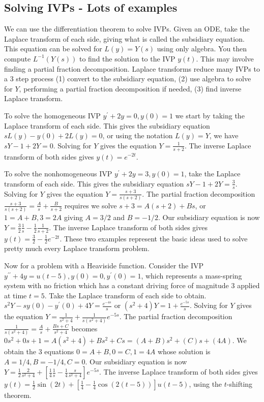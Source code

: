 \subsection{Solving IVPs - Lots of examples}
We can use the differentiation theorem to solve IVPs. Given an ODE, take the Laplace transform of each side, giving what is called the subsidiary equation.  This equation can be solved for $L(y)=Y(s)$ using only algebra.  You then compute $L^{-1}(Y(s))$ to find the solution to the IVP $y(t)$.  This may involve finding a partial fraction decomposition. Laplace transforms reduce many IVPs to a 3 step process (1) convert to the subsidiary equation, (2) use algebra to solve for $Y$, performing a partial fraction decomposition if needed, (3) find inverse Laplace transform.

To solve the homogeneous IVP $y^\prime +2y =0, y(0)=1$ we start by taking the Laplace transform of each side. This gives the subsidiary equation $sL(y)-y(0)+2L(y) = 0$, or using the notation $L(y)=Y$, we have $sY-1+2Y=0$.  Solving for $Y$ gives the equation $Y=\frac{1}{s+2}$. The inverse Laplace transform of both sides gives $y(t) = e^{-2t}$.  

To solve the nonhomogeneous IVP $y^\prime +2y =3, y(0)=1$, take the Laplace transform of each side. This gives the subsidiary equation $sY-1+2Y=\frac{3}{s}$.  Solving for $Y$ gives the equation $Y=\frac{s+3}{s(s+2)}$. The partial fraction decomposition $\frac{s+3}{s(s+2)}=\frac{A}{s}+\frac{B}{s+2}$ requires we solve $s+3 = A(s+2)+Bs$, or $1=A+B, 3=2A$ giving  $A=3/2$ and $B=-1/2$. Our subsidiary equation is now $Y = \frac{3}{2}\frac{1}{s}-\frac{1}{2}\frac{1}{s+2}$. The inverse Laplace transform of both sides gives $y(t) = \frac{3}{2}-\frac{1}{2}e^{-2t}$. These two examples represent the basic ideas used to solve pretty much every Laplace transform problem. 

Now for a problem with a Heaviside function. Consider the IVP $y^{\prime\prime} +4y =u(t-5), y(0)=0,y^\prime(0)=1$, which represents a mass-spring system with no friction which has a constant driving force of magnitude 3 applied at time $t=5$. Take the Laplace transform of each side to obtain. $s^2Y-sy(0)-y^\prime(0) +4Y=\frac{e^{-4s}}{s}$ or $(s^2+4)Y=1+\frac{e^{-5s}}{s}$.  Solving for $Y$ gives the equation $Y=\frac{1}{s^2+4}+\frac{1}{s(s^2+4)}e^{-5s}$. The partial fraction decomposition $\frac{1}{s(s^2+4)}=\frac{A}{s}+\frac{Bs+C}{s^2+4}$ becomes $0s^2+0s+1 = A(s^2+4)+Bs^2+Cs = (A+B)s^2+(C)s+(4A)$. We obtain the 3 equations $0=A+B, 0=C, 1=4A$ whose solution is  $A=1/4,B=-1/4,C=0$. Our subsidiary equation is now $Y=\frac{1}{2}\frac{2}{s^2+4}+\left[\frac{1}{4}\frac{1}{s}-\frac{1}{4}\frac{s}{s^2+4}\right]e^{-5s}$. The inverse Laplace transform of both sides gives $y(t) =\frac{1}{2}\sin(2t)+[\frac{1}{4}-\frac{1}{4}\cos(2(t-5))]u(t-5)$, using the $t$-shifting theorem. 

